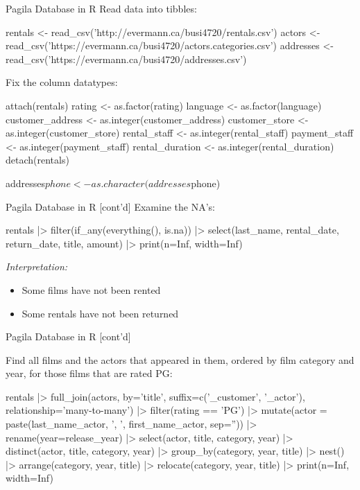 \documentclass[ignorenonframetext,xcolor=x11names]{beamer}
\begin{document}
\begin{frame}[fragile]{Pagila Database in R}
Read data into tibbles:
\small
\begin{Rcode}
rentals <- read_csv('http://evermann.ca/busi4720/rentals.csv')
actors <- 
  read_csv('https://evermann.ca/busi4720/actors.categories.csv')
addresses <- 
  read_csv('https://evermann.ca/busi4720/addresses.csv')
\end{Rcode}

Fix the column datatypes:

\footnotesize
\begin{Rcode}
attach(rentals)
rating <- as.factor(rating)
language <- as.factor(language)
customer_address <- as.integer(customer_address)
customer_store <- as.integer(customer_store)
rental_staff <- as.integer(rental_staff)
payment_staff <- as.integer(payment_staff)
rental_duration <- as.integer(rental_duration)
detach(rentals)

addresses$phone <- as.character(addresses$phone)
\end{Rcode}
\end{frame}

\begin{frame}[fragile]{Pagila Database in R \small [cont'd]}
Examine the NA's:
\footnotesize
\begin{Rcode}
rentals |> 
  filter(if_any(everything(), is.na)) |>
  select(last_name, rental_date, return_date, 
         title, amount) |>
  print(n=Inf, width=Inf)
\end{Rcode}
\normalsize
\emph{Interpretation:}
\begin{itemize}
  \item Some films have not been rented
  \item Some rentals have not been returned
\end{itemize}
\end{frame}

\begin{frame}[fragile]{Pagila Database in R \small [cont'd]}

Find all films and the actors that appeared in them, ordered by film category and year, for those films that are rated PG:

\scriptsize
\begin{Rcode}
rentals |> 
    full_join(actors, 
        by='title', 
        suffix=c('_customer', '_actor'), 
        relationship='many-to-many') |>
    filter(rating == 'PG') |>
    mutate(actor = 
        paste(last_name_actor, ', ', 
        first_name_actor, sep='')) |>
    rename(year=release_year) |>
    select(actor, title, category, year) |>
    distinct(actor, title, category, year) |>
    group_by(category, year, title) |> 
    nest() |>
    arrange(category, year, title) |>
    relocate(category, year, title) |>
    print(n=Inf, width=Inf)
\end{Rcode}
\end{frame}
\end{document}

